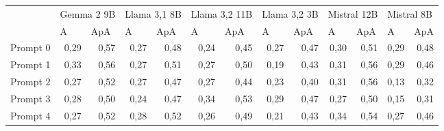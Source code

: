 \begin{tabular}{lrrrrrrrrrrrr}
\multicolumn{1}{c}{}                        & \multicolumn{2}{l}{Gemma 2 9B}                  & \multicolumn{2}{l}{Llama 3,1 8B}                & \multicolumn{2}{l}{Llama 3,2 11B}               & \multicolumn{2}{l}{Llama 3,2 3B}                & \multicolumn{2}{l}{Mistral 12B}                 & \multicolumn{2}{l}{Mistral 8B}                  \\
\multicolumn{1}{c}{}                        & \multicolumn{1}{l}{A} & \multicolumn{1}{l}{ApA} & \multicolumn{1}{l}{A} & \multicolumn{1}{l}{ApA} & \multicolumn{1}{l}{A} & \multicolumn{1}{l}{ApA} & \multicolumn{1}{l}{A} & \multicolumn{1}{l}{ApA} & \multicolumn{1}{l}{A} & \multicolumn{1}{l}{ApA} & \multicolumn{1}{l}{A} & \multicolumn{1}{l}{ApA} \\
Prompt 0                                    & 0,29                  & 0,57                    & 0,27                  & 0,48                    & 0,24                  & 0,45                    & 0,27                  & 0,47                    & 0,30                  & 0,51                    & 0,29                  & 0,48                    \\
Prompt 1                                    & 0,33                  & 0,56                    & 0,27                  & 0,51                    & 0,27                  & 0,50                    & 0,19                  & 0,43                    & 0,31                  & 0,56                    & 0,29                  & 0,46                    \\
Prompt 2                                    & 0,27                  & 0,52                    & 0,27                  & 0,47                    & 0,27                  & 0,44                    & 0,23                  & 0,40                    & 0,31                  & 0,56                    & 0,13                  & 0,32                    \\
Prompt 3                                    & 0,28                  & 0,50                    & 0,24                  & 0,47                    & 0,34                  & 0,53                    & 0,29                  & 0,47                    & 0,27                  & 0,50                    & 0,15                  & 0,31                    \\
Prompt 4                                    & 0,27                  & 0,52                    & 0,28                  & 0,52                    & 0,26                  & 0,49                    & 0,21                  & 0,43                    & 0,34                  & 0,54                    & 0,27                  & 0,46                    \\

\end{tabular}
